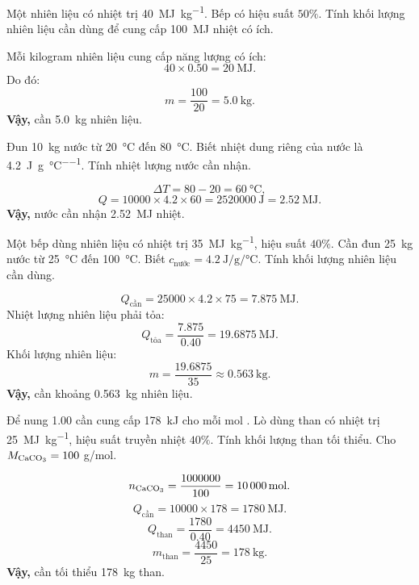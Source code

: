 \begin{tuluyen}
Một nhiên liệu có nhiệt trị \SI{40}{\mega\joule\per\kilo\gram}. Bếp có hiệu suất $50\%$. Tính khối lượng nhiên liệu cần dùng để cung cấp \SI{100}{\mega\joule} nhiệt có ích.
\begin{loigiaiBT}
Mỗi kilogram nhiên liệu cung cấp năng lượng có ích:
\[
40\times0.50=\SI{20}{\mega\joule}.
\]
Do đó:
\[
m=\frac{100}{20}=\SI{5.0}{\kilo\gram}.
\]
\textbf{Vậy,} cần \SI{5.0}{\kilo\gram} nhiên liệu.
\end{loigiaiBT}
\end{tuluyen}

\begin{tuluyen}
Đun \SI{10}{\kilo\gram} nước từ \SI{20}{\degreeCelsius} đến \SI{80}{\degreeCelsius}. Biết nhiệt dung riêng của nước là \SI{4.2}{\joule\per\gram\per\degreeCelsius}. Tính nhiệt lượng nước cần nhận.
\begin{loigiaiBT}
\[
\Delta T=80-20=\SI{60}{\degreeCelsius},
\]
\[
Q=10000\times4.2\times60=\SI{2520000}{\joule}=\SI{2.52}{\mega\joule}.
\]
\textbf{Vậy,} nước cần nhận \SI{2.52}{\mega\joule} nhiệt.
\end{loigiaiBT}
\end{tuluyen}

\begin{tuluyen}
Một bếp dùng nhiên liệu có nhiệt trị \SI{35}{\mega\joule\per\kilo\gram}, hiệu suất $40\%$. Cần đun \SI{25}{\kilo\gram} nước từ \SI{25}{\degreeCelsius} đến \SI{100}{\degreeCelsius}. Biết $c_{\text{nước}}=\SI{4.2}{\joule\per\gram\per\degreeCelsius}$. Tính khối lượng nhiên liệu cần dùng.
\begin{loigiaiBT}
\[
Q_{\text{cần}}=25000\times4.2\times75=\SI{7.875}{\mega\joule}.
\]
Nhiệt lượng nhiên liệu phải tỏa:
\[
Q_{\text{tỏa}}=\frac{7.875}{0.40}=\SI{19.6875}{\mega\joule}.
\]
Khối lượng nhiên liệu:
\[
m=\frac{19.6875}{35}\approx\SI{0.563}{\kilo\gram}.
\]
\textbf{Vậy,} cần khoảng \SI{0.563}{\kilo\gram} nhiên liệu.
\end{loigiaiBT}
\end{tuluyen}

\begin{tuluyen}
Để nung \SI{1.00}{\ton}  cần cung cấp \SI{178}{\kilo\joule} cho mỗi mol . Lò dùng than có nhiệt trị \SI{25}{\mega\joule\per\kilo\gram}, hiệu suất truyền nhiệt $40\%$. Tính khối lượng than tối thiểu. Cho $M_{\ce{CaCO3}}=100$ g/mol.
\begin{loigiaiBT}
\[
n_{\ce{CaCO3}}=\frac{1000000}{100}=\SI{10000}{\mole}.
\]
\[
Q_{\text{cần}}=10000\times178=\SI{1780}{\mega\joule}.
\]
\[
Q_{\text{than}}=\frac{1780}{0.40}=\SI{4450}{\mega\joule}.
\]
\[
m_{\text{than}}=\frac{4450}{25}=\SI{178}{\kilo\gram}.
\]
\textbf{Vậy,} cần tối thiểu \SI{178}{\kilo\gram} than.
\end{loigiaiBT}
\end{tuluyen}

